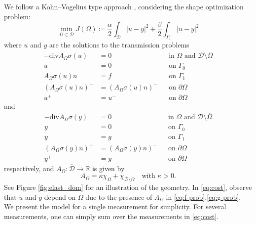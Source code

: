 \documentclass[preprint,9pt]{elsarticle}
\begin{document}
We follow a Kohn--Vogelius type approach \citep{MR739921},
considering the shape optimization problem:
\begin{equation}\label{eq:cost}
	\min_{\Omega \subset \mathcal{D}}
	J(\Omega) \coloneqq
	\frac{\alpha}{2}\int_{\mathcal{D}}|u-y|^{2} + 
	\frac{\beta}{2}\int_{\Gamma_{1}}|u-y|^{2}
\end{equation}
where $u$ and $y$ are the solutions to the transmission problems
\begin{equation} \label{eq:f-prob}
	\begin{aligned}
    -\mathrm{div} A_{\Omega} \sigma(u) &= 0 && \text{in } \Omega \text{ and } \mathcal{D}\setminus\overline{\Omega} \\
                                     u &= 0 && \text{on } \Gamma_{0} \\
                 A_{\Omega} \sigma(u)n &= f && \text{on } \Gamma_{1}   \\
		     (A_{\Omega} \sigma(u)n)^+ &= (A_{\Omega} \sigma(u)n)^- && \text{on } \partial\Omega\\      
				                   u^+ &= u^- && \text{on }  \partial\Omega      				              
	\end{aligned}	
\end{equation}
and
\begin{equation} \label{eq:g-prob}
	\begin{aligned}
    -\mathrm{div} A_{\Omega} \sigma(y) &= 0 && \text{in } \Omega  \text{ and } \mathcal{D}\setminus\overline \Omega \\
                                     y &= 0 && \text{on } \Gamma_{0} \\
                                     y &= g && \text{on } \Gamma_{1}   \\
			 (A_{\Omega} \sigma(y)n)^+ &= (A_{\Omega} \sigma(y)n)^- && \text{on } \partial\Omega\\      
								   y^+ &= y^- && \text{on } \partial\Omega       
	\end{aligned}
\end{equation}
respectively, and $A_{\Omega}\colon\overline{\mathcal{D}} \to \mathds{R}$ is given by
\begin{equation}\label{eq:AOmega}
A_{\Omega} = \kappa\chi_{\Omega} + \chi_{\overline{\mathcal{D}}\setminus\Omega}
\quad \text{with }\kappa>0.
\end{equation}
See Figure \ref{fig:elast_dom} for an illustration of the geometry.
In \eqref{eq:cost}, observe that $u$ and $y$ depend on $\Omega$ due to
the presence of $A_\Omega$ in \eqref{eq:f-prob},\eqref{eq:g-prob}.
We present the model for a single measurement for simplicity. 
For several measurements, one can simply sum over the measurements in \eqref{eq:cost}.
\end{document}
